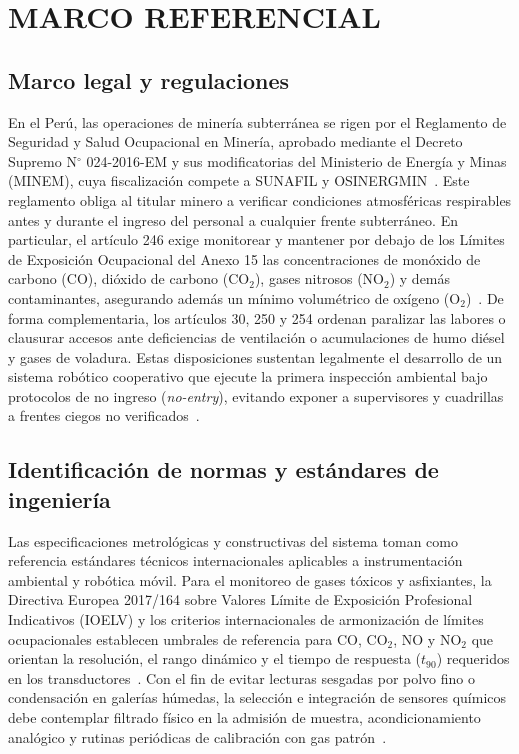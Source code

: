 \chapter{MARCO REFERENCIAL}

\section{Marco legal y regulaciones}

En el Perú, las operaciones de minería subterránea se rigen por el Reglamento de Seguridad y Salud Ocupacional en Minería, aprobado mediante el Decreto Supremo N$^\circ$ 024-2016-EM y sus modificatorias del Ministerio de Energía y Minas (MINEM), cuya fiscalización compete a SUNAFIL y OSINERGMIN~\cite{MINEM_DS024_2016, OSINERGMIN_BoletinGSM_2020}. Este reglamento obliga al titular minero a verificar condiciones atmosféricas respirables antes y durante el ingreso del personal a cualquier frente subterráneo. En particular, el artículo 246 exige monitorear y mantener por debajo de los Límites de Exposición Ocupacional del Anexo 15 las concentraciones de monóxido de carbono ($\text{CO}$), dióxido de carbono ($\text{CO}_2$), gases nitrosos ($\text{NO}_2$) y demás contaminantes, asegurando además un mínimo volumétrico de oxígeno ($\text{O}_2$)~\cite{MINEM_DS024_2016, OSINERGMIN_DS024_Compilado}. De forma complementaria, los artículos 30, 250 y 254 ordenan paralizar las labores o clausurar accesos ante deficiencias de ventilación o acumulaciones de humo diésel y gases de voladura. Estas disposiciones sustentan legalmente el desarrollo de un sistema robótico cooperativo que ejecute la primera inspección ambiental bajo protocolos de no ingreso (\textit{no-entry}), evitando exponer a supervisores y cuadrillas a frentes ciegos no verificados~\cite{MINEM_DS024_2016, OSINERGMIN_BoletinGSM_Ventilacion_2020}.

\section{Identificación de normas y estándares de ingeniería}

Las especificaciones metrológicas y constructivas del sistema toman como referencia estándares técnicos internacionales aplicables a instrumentación ambiental y robótica móvil. Para el monitoreo de gases tóxicos y asfixiantes, la Directiva Europea 2017/164 sobre Valores Límite de Exposición Profesional Indicativos (IOELV) y los criterios internacionales de armonización de límites ocupacionales establecen umbrales de referencia para $\text{CO}$, $\text{CO}_2$, $\text{NO}$ y $\text{NO}_2$ que orientan la resolución, el rango dinámico y el tiempo de respuesta ($t_{90}$) requeridos en los transductores~\cite{EU_ExposureDirective_2020, Deveau2015_OEL}. Con el fin de evitar lecturas sesgadas por polvo fino o condensación en galerías húmedas, la selección e integración de sensores químicos debe contemplar filtrado físico en la admisión de muestra, acondicionamiento analógico y rutinas periódicas de calibración con gas patrón~\cite{Cepa2023_sensors, EU_ExposureDirective_2020}.

